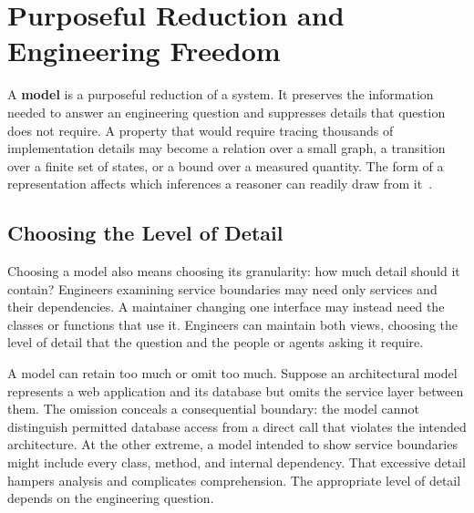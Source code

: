 \section{Purposeful Reduction and Engineering Freedom}\label{heading:a-model-is-a-purposeful-reduction}




A \textbf{model} is a purposeful reduction of a system. It preserves the information needed to answer an engineering question and suppresses details that question does not require. A property that would require tracing thousands of implementation details may become a relation over a small graph, a transition over a finite set of states, or a bound over a measured quantity. The form of a representation affects which inferences a reasoner can readily draw from it~\citep{davis1993kr}.

\subsection{Choosing the Level of Detail}\label{heading:choosing-the-level-of-detail}

Choosing a model also means choosing its granularity: how much detail should it contain? Engineers examining service boundaries may need only services and their dependencies. A maintainer changing one interface may instead need the classes or functions that use it. Engineers can maintain both views, choosing the level of detail that the question and the people or agents asking it require.


A model can retain too much or omit too much. Suppose an architectural model represents a web application and its database but omits the service layer between them. The omission conceals a consequential boundary: the model cannot distinguish permitted database access from a direct call that violates the intended architecture. At the other extreme, a model intended to show service boundaries might include every class, method, and internal dependency. That excessive detail hampers analysis and complicates comprehension. The appropriate level of detail depends on the engineering question.


